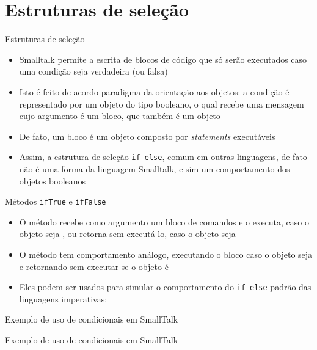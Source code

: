 \section{Estruturas de seleção}

\begin{frame}[fragile]{Estruturas de seleção}

    \begin{itemize}
        \item Smalltalk permite a escrita de blocos de código que só serão executados caso uma
            condição seja verdadeira (ou falsa)

        \item Isto é feito de acordo paradigma da orientação aos objetos: a condição é representado
            por um objeto do tipo booleano, o qual recebe uma mensagem cujo argumento é um bloco,
            que também é um objeto

        \item De fato, um bloco é um objeto composto por \textit{statements} executáveis

        \item Assim, a estrutura de seleção  \texttt{if-else}, comum em outras linguagens, de 
            fato não é uma forma da linguagem Smalltalk, e sim um comportamento dos objetos
            booleanos

    \end{itemize}

\end{frame}

\begin{frame}[fragile]{Métodos \texttt{ifTrue} e \texttt{ifFalse}}

    \begin{itemize}
        \item O método  recebe como argumento um bloco de comandos e o
            executa, caso o objeto seja , ou retorna sem executá-lo, caso
            o objeto seja 


        \item O método  tem comportamento análogo, executando o bloco
            caso o objeto seja  e retornando sem executar se o objeto é


        \item Eles podem ser usados para simular o comportamento do \texttt{if-else} padrão das
            linguagens imperativas:

    \end{itemize}

\end{frame}

\begin{frame}[fragile]{Exemplo de uso de condicionais em SmallTalk}
\end{frame}

\begin{frame}[fragile]{Exemplo de uso de condicionais em SmallTalk}
\end{frame}

